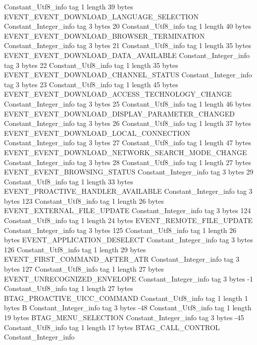{{{		}
		Constant_Utf8_info {
			tag	1
			length	39
			bytes	EVENT_EVENT_DOWNLOAD_LANGUAGE_SELECTION
		}
		Constant_Integer_info {
			tag	3
			bytes	20
		}
		Constant_Utf8_info {
			tag	1
			length	40
			bytes	EVENT_EVENT_DOWNLOAD_BROWSER_TERMINATION
		}
		Constant_Integer_info {
			tag	3
			bytes	21
		}
		Constant_Utf8_info {
			tag	1
			length	35
			bytes	EVENT_EVENT_DOWNLOAD_DATA_AVAILABLE
		}
		Constant_Integer_info {
			tag	3
			bytes	22
		}
		Constant_Utf8_info {
			tag	1
			length	35
			bytes	EVENT_EVENT_DOWNLOAD_CHANNEL_STATUS
		}
		Constant_Integer_info {
			tag	3
			bytes	23
		}
		Constant_Utf8_info {
			tag	1
			length	45
			bytes	EVENT_EVENT_DOWNLOAD_ACCESS_TECHNOLOGY_CHANGE
		}
		Constant_Integer_info {
			tag	3
			bytes	25
		}
		Constant_Utf8_info {
			tag	1
			length	46
			bytes	EVENT_EVENT_DOWNLOAD_DISPLAY_PARAMETER_CHANGED
		}
		Constant_Integer_info {
			tag	3
			bytes	26
		}
		Constant_Utf8_info {
			tag	1
			length	37
			bytes	EVENT_EVENT_DOWNLOAD_LOCAL_CONNECTION
		}
		Constant_Integer_info {
			tag	3
			bytes	27
		}
		Constant_Utf8_info {
			tag	1
			length	47
			bytes	EVENT_EVENT_DOWNLOAD_NETWORK_SEARCH_MODE_CHANGE
		}
		Constant_Integer_info {
			tag	3
			bytes	28
		}
		Constant_Utf8_info {
			tag	1
			length	27
			bytes	EVENT_EVENT_BROWSING_STATUS
		}
		Constant_Integer_info {
			tag	3
			bytes	29
		}
		Constant_Utf8_info {
			tag	1
			length	33
			bytes	EVENT_PROACTIVE_HANDLER_AVAILABLE
		}
		Constant_Integer_info {
			tag	3
			bytes	123
		}
		Constant_Utf8_info {
			tag	1
			length	26
			bytes	EVENT_EXTERNAL_FILE_UPDATE
		}
		Constant_Integer_info {
			tag	3
			bytes	124
		}
		Constant_Utf8_info {
			tag	1
			length	24
			bytes	EVENT_REMOTE_FILE_UPDATE
		}
		Constant_Integer_info {
			tag	3
			bytes	125
		}
		Constant_Utf8_info {
			tag	1
			length	26
			bytes	EVENT_APPLICATION_DESELECT
		}
		Constant_Integer_info {
			tag	3
			bytes	126
		}
		Constant_Utf8_info {
			tag	1
			length	29
			bytes	EVENT_FIRST_COMMAND_AFTER_ATR
		}
		Constant_Integer_info {
			tag	3
			bytes	127
		}
		Constant_Utf8_info {
			tag	1
			length	27
			bytes	EVENT_UNRECOGNIZED_ENVELOPE
		}
		Constant_Integer_info {
			tag	3
			bytes	-1
		}
		Constant_Utf8_info {
			tag	1
			length	27
			bytes	BTAG_PROACTIVE_UICC_COMMAND
		}
		Constant_Utf8_info {
			tag	1
			length	1
			bytes	B
		}
		Constant_Integer_info {
			tag	3
			bytes	-48
		}
		Constant_Utf8_info {
			tag	1
			length	19
			bytes	BTAG_MENU_SELECTION
		}
		Constant_Integer_info {
			tag	3
			bytes	-45
		}
		Constant_Utf8_info {
			tag	1
			length	17
			bytes	BTAG_CALL_CONTROL
		}
		Constant_Integer_info {
}}}
